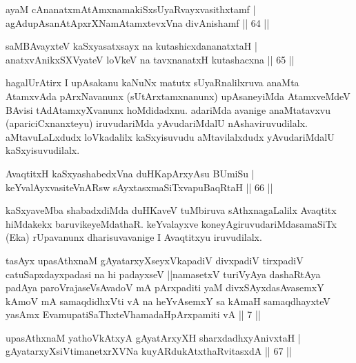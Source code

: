 \begin{shl}
ayaM cAnanatxmAtAmxnamakiSxsUyaRvayxvasithxtamf  | \\
agAdupAsanAtApxrXNamAtamxtevxVna divAnishamf \hfill||  64 || 
\end{shl}

\begin{shl}
saMBAvayxteV kaSxyasatxsayx na kutashicxdananatxtaH | \\
anatxvAnikxSXVyateV loVkeV na tavxnanatxH kutashacxna \hfill||  65 || 
\end{shl}

\begin{artha} 
hagalUrAtirx I upAsakanu kaNuNx matutx sUyaRnalilxruva anaMta 
AtamxvAda pArxNavanunx (sUtArxtamxnanunx) upAsaneyiMda AtamxveMdeV 
BAvisi tAdAtamxyXvanunx hoMdidadxnu. adariMda avanige anaMtatavxvu 
(apariciCxnanxteyu) iruvudariMda yAvudariMdalU nAshaviruvudilalx. 
aMtavuLaLxdudx loVkadalilx kaSxyisuvudu aMtavilalxdudx yAvudariMdalU 
kaSxyisuvudilalx.
\end{artha}

\begin{shl}
AvaqtitxH kaSxyashabedxVna duHKapArxyAsu BUmiSu | \\
keYvalAyxvasiteVnARsw sAyxtasxmaSiTxvapuBaqRtaH \hfill||  66 || 
\end{shl}

\begin{artha} 
kaSxyaveMba shabadxdiMda duHKaveV tuMbiruva sAthxnagaLalilx Avaqtitx 
hiMdakekx baruvikeyeMdathaR. keYvalayxve koneyAgiruvudariMda\break samaSiTx 
(Eka) rUpavanunx dharisuvavanige I Avaqtitxyu iruvudilalx.
\end{artha}

\begin{kandikeshl}
tasAyx upasAthxnaM gAyatarxyXseyxVkapadiV divxpadiV tirxpadiV catuSapxdayxpadasi na hi padayxseV ||namasetxV turiVyAya dashaRtAya padAya paroVrajaseV\s sAvadoV mA pArxpaditi yaM divxSAyxdasAvasemxY kAmoV mA samaqdidhxVti vA na heYvAsemxY sa kAmaH samaqdhayxteV yasAmx EvamupatiSaThxteV\s hamadaH\break pArxpamiti vA || 7 ||
\end{kandikeshl}

\begin{shl}
upasAthxnaM yathoVkAtxyA gAyatArxyXH sharxdadhxyA\s nivxtaH | \\
gAyatarxyXsiVtimanetxrXVNa kuyARdukAtxthaRvitasxdA \hfill||  67 || 
\end{shl}

